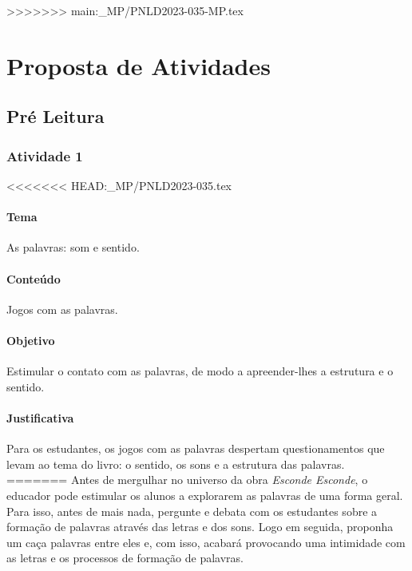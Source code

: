 \documentclass[11pt]{extarticle}
\begin{document}
>>>>>>> main:_MP/PNLD2023-035-MP.tex

\section{Proposta de Atividades}
\subsection{Pré Leitura}
\subsubsection{Atividade 1}


<<<<<<< HEAD:_MP/PNLD2023-035.tex

\paragraph{Tema} As palavras: som e sentido. 

\paragraph{Conteúdo} Jogos com as palavras. 

\paragraph{Objetivo} Estimular o contato com as palavras, de modo a apreender-lhes a estrutura e o sentido. 

\paragraph{Justificativa} Para os estudantes, os jogos com as palavras despertam questionamentos que levam ao tema do livro: o sentido, os sons e a estrutura das palavras.   
=======
Antes de mergulhar no universo da obra \textit{Esconde Esconde}, o educador pode estimular os alunos a explorarem as palavras de uma forma geral. Para isso, antes de mais nada, pergunte e debata com os estudantes sobre a formação de palavras através das letras e dos sons. Logo em seguida, proponha um caça palavras entre eles e, com isso, acabará provocando uma intimidade com as letras e os processos de formação de palavras. 
\end{document}
